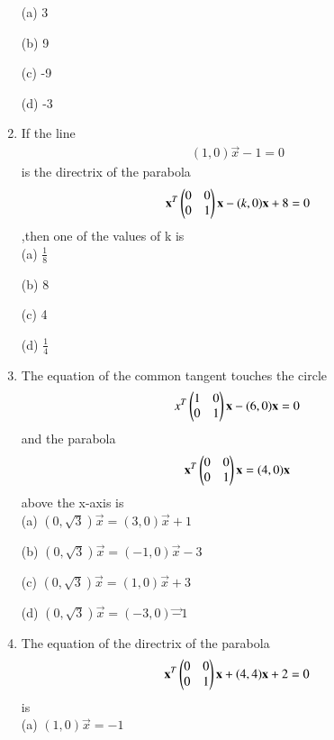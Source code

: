 \documentclass[journal,12pt,twocolumn]{IEEEtran}
\begin{document}
\begin{enumerate}
    \choice (a) 3
    
    \choice (b) 9
    
    \choice (c) -9
    
    \choice (d) -3\\
    
    \item If the line \begin{align}(1,0)\vec x-1=0\end{align}is the directrix of the parabola \begin{align}\mathbf x^T \begin{pmatrix}0 & 0 \\0 & 1\end{pmatrix} \mathbf x-(k,0)\mathbf x +8=0\end{align},then one of the values of k is \\
    
    \choice (a) $\frac{1}{8}$
    
    \choice (b) 8
    
    \choice (c) 4
    
    \choice (d) $\frac{1}{4}$\\
    
    \item The equation of the common tangent touches the circle \begin{align}x^T\begin{pmatrix}1 & 0 \\0 & 1\end{pmatrix}\mathbf x-(6,0)\mathbf x =0\end{align} and the parabola \begin{align}\mathbf x^T \begin{pmatrix}0 & 0 \\0 & 1\end{pmatrix}\mathbf x=(4,0)\mathbf x\end{align} above the x-axis is \\
    
    \choice (a) $(0,\sqrt{3})\vec x=(3,0)\vec x+1$
    
    \choice (b) $(0,\sqrt{3})\vec x=(-1,0)\vec x-3$
    
    \choice (c) $(0,\sqrt{3})\vec x=(1,0)\vec x+3$
    
    \choice (d) $(0,\sqrt{3})\vec x=(-3,0)\vec -1$\\
    
    \item The equation of the directrix of the parabola \begin{align}\mathbf x^T \begin{pmatrix}0 & 0 \\0 & 1\end{pmatrix}\mathbf x+(4,4)\mathbf x +2=0\end{align} is\\
    
    \choice (a) $(1,0)\vec x=-1$
    

\end{enumerate}
\end{document}
